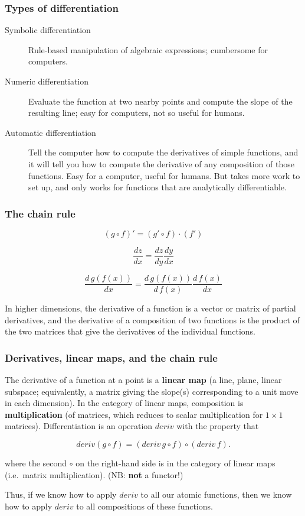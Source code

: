 \documentclass[10pt]{beamer}
\theoremstyle{definition}
\theoremstyle{remark}
\numberwithin{equation}{section}
\begin{document}
\begin{frame}[fragile]
  \frametitle{Types of differentiation}

  \begin{description}
  \item[Symbolic differentiation] Rule-based manipulation of algebraic
    expressions; cumbersome for computers.
  \item[Numeric differentiation] Evaluate the function at two nearby points and
    compute the slope of the resulting line; easy for computers, not so useful
    for humans.
  \item[Automatic differentiation] Tell the computer how to compute the
    derivatives of simple functions, and it will tell you how to compute the
    derivative of any composition of those functions. Easy for a computer,
    useful for humans. But takes more work to set up, and only works for
    functions that are analytically differentiable.
  \end{description}
\end{frame}

\begin{frame}[fragile]
  \frametitle{The chain rule}

  \[(g \circ f)' = (g' \circ f) \cdot (f')\]

  \[\frac{dz}{dx} = \frac{dz}{dy} \frac{dy}{dx}\]

  \[\frac{d\,g(f(x))}{dx} = \frac{d\,g(f(x))}{d\,f(x)} \frac{d\,f(x)}{dx}\]

  In higher dimensions, the derivative of a function is a vector or matrix of
  partial derivatives,
  and the derivative of a composition of two functions is the product of the two
  matrices that give the derivatives of the individual functions.

\end{frame}

\begin{frame}[fragile]
  \frametitle{Derivatives, linear maps, and the chain rule}
  
  The derivative of a function at a point is a \textbf{linear map} (a line,
  plane, linear subspace; equivalently, a matrix giving the slope(s)
  corresponding to a unit move in each dimension). In the category of linear
  maps, composition is \textbf{multiplication} (of matrices, which reduces to
  scalar multiplication for $1 \times 1$ matrices). Differentiation is an operation
  $deriv$ with the property that

  \[
    deriv(g \circ f) = (deriv\, g \circ f) \circ (deriv\, f).
  \]

  where the second $\circ$ on the right-hand side is in the category of linear maps
  (i.e.\ matrix multiplication). {\small (NB: \textbf{not} a functor!)}

  Thus, if we know how to apply $deriv$ to all our atomic functions, then we
  know how to apply $deriv$ to all compositions of these functions.
  
\end{frame}
\end{document}
